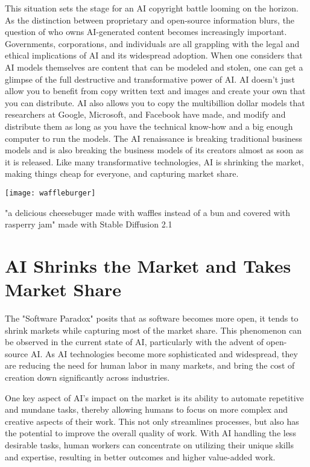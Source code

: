 This situation sets the stage for an AI copyright battle looming on the horizon. As the distinction between proprietary and open-source information blurs, the question of who owns AI-generated content becomes increasingly important. Governments, corporations, and individuals are all grappling with the legal and ethical implications of AI and its widespread adoption. When one considers that AI models themselves are content that can be modeled and stolen, one can get a glimpse of the full destructive and transformative power of AI. AI doesn't just allow you to benefit from copy written text and images and create your own that you can distribute. AI also allows you to copy the multibillion dollar models that researchers at Google, Microsoft, and Facebook have made, and modify and distribute them as long as you have the technical know-how and a big enough computer to run the models. The AI renaissance is breaking traditional business models and is also breaking the business models of its creators almost as soon as it is released. Like many transformative technologies, AI is shrinking the market, making things cheap for everyone, and capturing market share.

\begin{pdf}
\begin{marginfigure}[-5.5cm]
    \texttt{[image: waffleburger]}
        \caption{"a delicious cheesebuger made with waffles instead of a bun and covered with rasperry jam" made with Stable Diffusion 2.1}
\end{marginfigure}
\end{pdf}

\section{AI Shrinks the Market and Takes Market Share}

The "Software Paradox" posits that as software becomes more open, it tends to shrink markets while capturing most of the market share. This phenomenon can be observed in the current state of AI, particularly with the advent of open-source AI. As AI technologies become more sophisticated and widespread, they are reducing the need for human labor in many markets, and bring the cost of creation down significantly across industries.

One key aspect of AI’s impact on the market is its ability to automate repetitive and mundane tasks, thereby allowing humans to focus on more complex and creative aspects of their work. This not only streamlines processes, but also has the potential to improve the overall quality of work. With AI handling the less desirable tasks, human workers can concentrate on utilizing their unique skills and expertise, resulting in better outcomes and higher value-added work.

